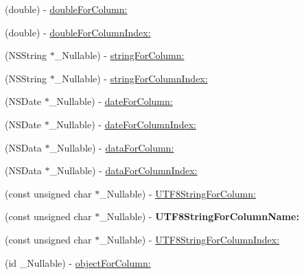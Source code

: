 \begin{DoxyCompactItemize}
\item 
(double) -\/ \mbox{\hyperlink{interface_o_p_t_l_y_f_m_d_b_result_set_a65460490ebc13600470cab4ae42f4bb4}{double\+For\+Column\+:}}
\item 
(double) -\/ \mbox{\hyperlink{interface_o_p_t_l_y_f_m_d_b_result_set_add5fea1d6cda3b32f38de2fb4b0d7817}{double\+For\+Column\+Index\+:}}
\item 
(N\+S\+String $\ast$\+\_\+\+Nullable) -\/ \mbox{\hyperlink{interface_o_p_t_l_y_f_m_d_b_result_set_a809b02921be458f48d375b5c1cb0a39e}{string\+For\+Column\+:}}
\item 
(N\+S\+String $\ast$\+\_\+\+Nullable) -\/ \mbox{\hyperlink{interface_o_p_t_l_y_f_m_d_b_result_set_a781fca5064058907dc16d9723ee2a4b6}{string\+For\+Column\+Index\+:}}
\item 
(N\+S\+Date $\ast$\+\_\+\+Nullable) -\/ \mbox{\hyperlink{interface_o_p_t_l_y_f_m_d_b_result_set_a2896eb3784b41a2408744c77f78512f5}{date\+For\+Column\+:}}
\item 
(N\+S\+Date $\ast$\+\_\+\+Nullable) -\/ \mbox{\hyperlink{interface_o_p_t_l_y_f_m_d_b_result_set_ae5c24425fd6b0f63bb7cec97f26dc8ed}{date\+For\+Column\+Index\+:}}
\item 
(N\+S\+Data $\ast$\+\_\+\+Nullable) -\/ \mbox{\hyperlink{interface_o_p_t_l_y_f_m_d_b_result_set_aabb9796a0926d185627cb5e24c88f978}{data\+For\+Column\+:}}
\item 
(N\+S\+Data $\ast$\+\_\+\+Nullable) -\/ \mbox{\hyperlink{interface_o_p_t_l_y_f_m_d_b_result_set_aa66982b843b56f09bdeb3ee7b5b8fa36}{data\+For\+Column\+Index\+:}}
\item 
(const unsigned char $\ast$\+\_\+\+Nullable) -\/ \mbox{\hyperlink{interface_o_p_t_l_y_f_m_d_b_result_set_ae19dc3c97fc5fa7fef98ce2a74471294}{U\+T\+F8\+String\+For\+Column\+:}}
\item 
\mbox{\label{interface_o_p_t_l_y_f_m_d_b_result_set_aeb20bd8380eb1dae59458b1639068cb9}} 
(const unsigned char $\ast$\+\_\+\+Nullable) -\/ {\bfseries U\+T\+F8\+String\+For\+Column\+Name\+:}
\item 
(const unsigned char $\ast$\+\_\+\+Nullable) -\/ \mbox{\hyperlink{interface_o_p_t_l_y_f_m_d_b_result_set_a7a6aeb37554ce04a0573ef4007110df4}{U\+T\+F8\+String\+For\+Column\+Index\+:}}
\item 
(id \+\_\+\+Nullable) -\/ \mbox{\hyperlink{interface_o_p_t_l_y_f_m_d_b_result_set_adc62819e11eff432ebf07e784e4ef86f}{object\+For\+Column\+:}}
\item 

\end{DoxyCompactItemize}
